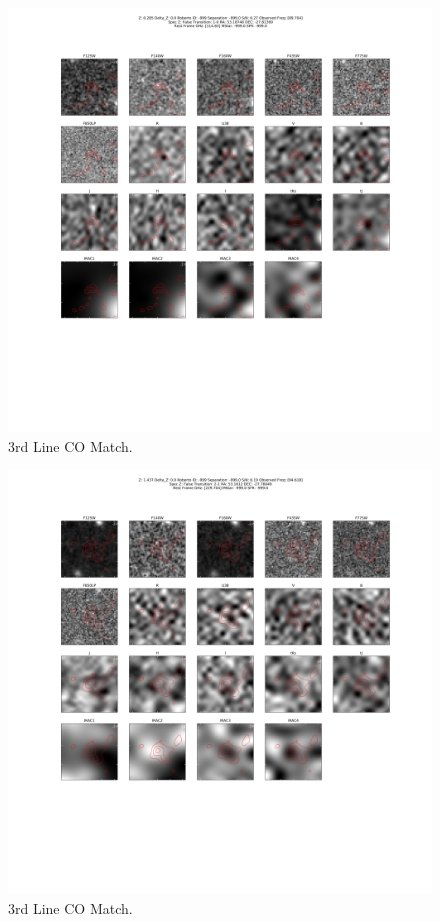 \begin{figure}[tbp]
\centering \includegraphics[width=120mm]{Matched/ASPECS_Cutout_19.png}
\caption{3rd Line CO Match.}
\label{fig:Match_Three}
\end{figure}

\begin{figure}[tbp]
\centering \includegraphics[width=120mm]{Matched/ASPECS_Cutout_20.png}
\caption{3rd Line CO Match.}
\label{fig:Match_Three}
\end{figure}

